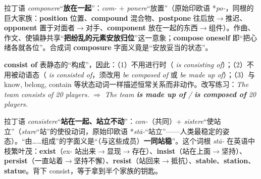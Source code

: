 \documentclass[../main.tex]{subfiles}
\begin{document}
\ex{She composed a short s[l.eech for the graduation ceremony.}


\begin{origin}
拉丁语 \textit{componere}“\textbf{放在一起}”：\textit{com-} + \textit{ponere}“放置”（原始印欧语 *\textit{po-}，同根的巨大家族：\textbf{position} 位置、\textbf{compound} 混合物、\textbf{postpone} 往后放$\to$推迟、\textbf{opponent} 置于对面者$\to$对手、\textbf{component} 放在一起的东西$\to$组件）。作曲、作文、使镇静共享“\textbf{把纷乱的元素安放归位}”这一意象；\textbf{compose oneself} 即“把心绪各就各位”。合成词 \textbf{composure} 字面义竟是“安放妥当的状态”。
\end{origin}



\begin{gram}
\textbf{consist of} 表静态的“构成”，因此：（1）不用进行时（ \textit{is consisting of}）；（2）不用被动语态（ \textit{is consisted of}，须改用 \textit{be composed of} 或 \textit{be made up of}）；（3）与 know, belong, contain 等状态动词一样描述恒常关系而非动作。改写练习：\textit{The team consists of 20 players.} $\Rightarrow$ \textit{The team \textbf{is made up of} / \textbf{is composed of} 20 players.}
\end{gram}

\begin{origin}
拉丁语 \textit{consistere}“\textbf{站在一起、站立不动}”：\textit{con-}（共同）+ \textit{sistere}“使站立”（\textit{stare}“站”的使役动词，原始印欧语 *\textit{stā-}“站立”——人类最稳定的姿态）。“由……组成”的字面义是“（与这些成员）\textbf{一同站稳}”。这个词根 \textit{stā-} 在英语中枝繁叶茂：\textbf{exist}（ex- 站出来$\to$显现$\to$存在）、\textbf{insist}（站在上面$\to$坚持）、\textbf{persist}（一直站着$\to$坚持不懈）、\textbf{resist}（站回来$\to$抵抗）、\textbf{stable}、\textbf{station}、\textbf{statue}。背下 consist，等于拿到半个家族的钥匙。
\end{origin}
\end{document}
